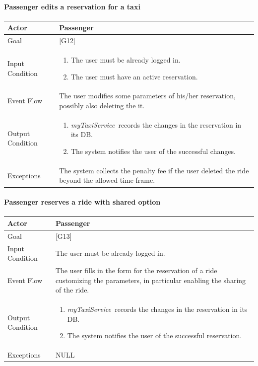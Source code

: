 \documentclass[a4paper,11pt]{report} %
\newcommand{\mts}{\mbox{\normalfont\itshape myTaxiService\ }}
\begin{document}
	\pagebreak
	
	\paragraph{Passenger edits a reservation for a taxi}
	\begin{center}
		\begin{tabular}{| l | p{9cm} |}\hline
			Actor & Passenger\\\hline
			Goal & {[}G12{]} \\\hline
			Input Condition & \begin{enumerate}
									\item The user must be already logged in.
									\item The user must have an active reservation.
							  \end{enumerate}\\\hline
			Event Flow & The user modifies some parameters of his/her reservation, possibly also deleting the it.\\\hline
			Output Condition & \begin{enumerate}
									\item \mts records the changes in the reservation in its DB.
									\item The system notifies the user of the successful changes.
						   	   \end{enumerate}\\\hline
			Exceptions & The system collects the penalty fee if the user deleted the ride beyond the allowed time-frame.\\\hline
		\end{tabular}
	\end{center}	
	
	\pagebreak
	
	\paragraph{Passenger reserves a ride with shared option}
	\begin{center}
		\begin{tabular}{| l | p{9cm} |}\hline
			Actor & Passenger\\\hline
			Goal & {[}G13{]} \\\hline
			Input Condition & The user must be already logged in.\\\hline
			Event Flow & The user fills in the form for the reservation of a ride customizing the parameters, in particular enabling the sharing of the ride.\\\hline
			Output Condition & \begin{enumerate}
				\item \mts records the changes in the reservation in its DB.
				\item The system notifies the user of the successful reservation.
			\end{enumerate}\\\hline
			Exceptions & NULL\\\hline
		\end{tabular}
	\end{center}	
	
\end{document}

